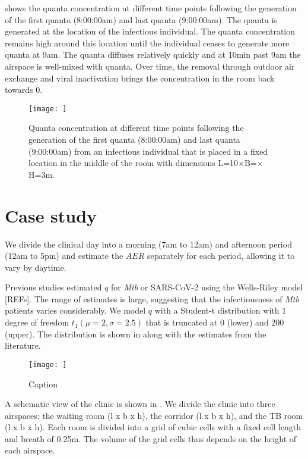 \documentclass[fleqn,11pt]{wlscirep_supp}
\begin{document}
 shows the quanta concentration at different time points following the generation of the first quanta (8:00:00am) and last quanta (9:00:00am). The quanta is generated at the location of the infectious individual. The quanta concentration remains high around this location until the individual ceases to generate more quanta at 9am. The quanta diffuses relatively quickly and at 10min past 9am the airspace is well-mixed with quanta. Over time, the removal through outdoor air exchange and viral inactivation brings the concentration in the room back towards 0. 

\begin{figure}
    \centering
    \texttt{[image: ]}
    \caption{Quanta concentration at different time points following the generation of the first quanta (8:00:00am) and last quanta (9:00:00am) from an infectious individual that is placed in a fixed location in the middle of the room with dimensions L=10$\times$B=\5$\times$H=3m.}
    \label{fig:toy-example}
\end{figure}

\clearpage



\section{Case study}

We divide the clinical day into a morning (7am to 12am) and afternoon period (12am to 5pm) and estimate the $AER$ separately for each period, allowing it to vary by daytime.

Previous studies estimated $q$ for \emph{Mtb} or SARS-CoV-2 using the Wells-Riley model [REFs]. The range of estimates is large, suggesting that the infectiousness of \emph{Mtb} patients varies considerably. We model $q$ with a Student-t distribution with 1 degree of freedom $t_1(\mu = 2, \sigma = 2.5)$ that is truncated at 0 (lower) and 200 (upper). The distribution is shown in  along with the estimates from the literature.

\begin{figure}
    \centering
    \texttt{[image: ]}
    \caption{Caption}
    \label{fig:quanta-distribution}
\end{figure}


A schematic view of the clinic is shown in . We divide the clinic into three airspaces: the waiting room (l x b x h), the corridor (l x b x h), and the TB room (l x b x h). Each room is divided into a grid of cubic cells with a fixed cell length and breath of 0.25m. The volume of the grid cells thus depends on the height of each airspace. 
\end{document}
